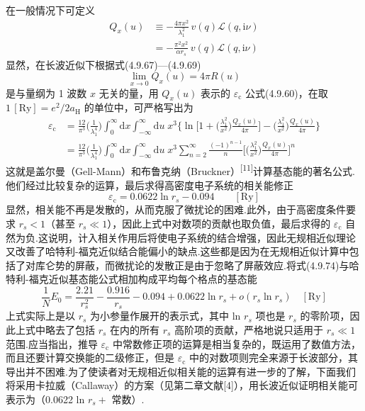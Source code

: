 在一般情况下可定义
\begin{equation}
\begin{aligned}
  Q_{x}(u)&\equiv-\frac{4\pi x^{2}}{\lambda_{1}^{2}}\,
  v(q)\mathcal{L}(q,\mathrm{i}\nu)\\
  &=-\frac{\pi^{2}x^{2}}{\alpha r_{s}}\,
  v(q)\mathcal{L}(q,\mathrm{i}\nu)
\end{aligned}
\end{equation}
显然，在长波近似下根据式(4.9.67)—(4.9.69)
\begin{equation}
  \lim_{x\to 0}Q_{x}(u)=4\pi R(u)
\end{equation}
是与量纲为 1 波数 $x$ 无关的量，用 $Q_{x}(u)$ 表示的 $\varepsilon_{\mathrm{c}}$ 公式(4.9.60)，在取 $1\,[\mathrm{Ry}]=e^{2}/2a_{\mathrm{H}}$ 的单位中，可严格写出为
\begin{equation}
\begin{aligned}
  \varepsilon_{\mathrm{c}}
  &=\frac{12}{\pi^{3}}\bigg(\frac{1}{\lambda_{1}^{4}}\bigg)
  \int_{0}^{\infty}\mathrm{d}x\int_{-\infty}^{\infty}\mathrm{d}u\;x^{3}
  \bigg\{\ln\bigg[1+\bigg(\frac{\lambda_{1}^{2}}{x^{2}}\bigg)
  \frac{Q_{x}(u)}{4\pi}\bigg]
  -\bigg(\frac{\lambda_{1}^{2}}{x^{2}}\bigg)\frac{Q_{x}(u)}{4\pi}\bigg\}\\
  &=\frac{12}{\pi^{3}}\bigg(\frac{1}{\lambda_{1}^{4}}\bigg)
  \int_{0}^{\infty}\mathrm{d}x\int_{-\infty}^{\infty}\mathrm{d}u\;x^{3}
  \sum_{n=2}^{\infty}\frac{(-1)^{n-1}}{n}
  \bigg[\bigg(\frac{\lambda_{1}^{2}}{x^{2}}\bigg)
  \frac{Q_{x}(u)}{4\pi}\bigg]^{n}
\end{aligned}
\end{equation}
这就是盖尔曼（Gell-Mann）和布鲁克纳（Bruckner）\textsuperscript{[11]}计算基态能的著名公式.他们经过比较复杂的运算，最后求得高密度电子系统的相关能修正
\begin{equation}
  \varepsilon_{\mathrm{c}}=0.0622\ln r_{s}-0.094\qquad\left[\mathrm{Ry}\right]
\end{equation}
显然，相关能不再是发散的，从而克服了微扰论的困难.此外，由于高密度条件要求 $r_{s}<1$（甚至 $r_{s}\ll 1$），因此上式中对数项的贡献也取负值，最后求得的 $\varepsilon_{\mathrm{c}}$ 自然为负.这说明，计入相关作用后将使电子系统的结合增强，因此无规相近似理论又改善了哈特利-福克近似结合能偏小的缺点.这些都是因为在无规相近似计算中包括了对库仑势的屏蔽，而微扰论的发散正是由于忽略了屏蔽效应.将式(4.9.74)与哈特利-福克近似基态能公式相加构成平均每个格点的基态能
\begin{equation}
  \frac{1}{N}E_{0}=\frac{2.21}{r_{s}^{2}}-\frac{0.916}{r_{s}}-0.094
  +0.0622\ln r_{s}+o\left(r_{s}\ln r_{s}\right)\quad\left[\mathrm{Ry}\right]
\end{equation}
上式实际上是以 $r_{s}$ 为小参量作展开的表示式，其中 ln $r_{s}$ 项也是 $r_{s}$ 的零阶项，因此上式中略去了包括 $r_{s}$ 在内的所有 $r_{s}$ 高阶项的贡献，严格地说只适用于 $r_{s}\ll 1$ 范围.应当指出，推导 $\varepsilon_{\mathrm{c}}$ 中常数修正项的运算是相当复杂的，既运用了数值方法，而且还要计算交换能的二级修正，但是 $\varepsilon_{\mathrm{c}}$ 中的对数项则完全来源于长波部分，其导出并不困难.为了使读者对无规相近似相关能的运算有进一步的了解，下面我们将采用卡拉威（Callaway）的方案（见第二章文献[4]），用长波近似证明相关能可表示为（0.0622 ln $r_{s}+$ 常数）.

